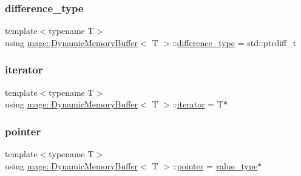 \subsubsection{\texorpdfstring{difference\+\_\+type}{difference\_type}}
{\footnotesize\ttfamily template$<$typename T$>$ \\
using \mbox{\hyperlink{classmage_1_1_dynamic_memory_buffer}{mage\+::\+Dynamic\+Memory\+Buffer}}$<$ T $>$\+::\mbox{\hyperlink{classmage_1_1_dynamic_memory_buffer_ae708f71fce978c1029c2228c249316a6}{difference\+\_\+type}} =  std\+::ptrdiff\+\_\+t}

\mbox{\label{classmage_1_1_dynamic_memory_buffer_aa5dca8e81d0c2a9e63d3a9bc61cce904}} 
\subsubsection{\texorpdfstring{iterator}{iterator}}
{\footnotesize\ttfamily template$<$typename T$>$ \\
using \mbox{\hyperlink{classmage_1_1_dynamic_memory_buffer}{mage\+::\+Dynamic\+Memory\+Buffer}}$<$ T $>$\+::\mbox{\hyperlink{classmage_1_1_dynamic_memory_buffer_aa5dca8e81d0c2a9e63d3a9bc61cce904}{iterator}} =  T$\ast$}

\mbox{\label{classmage_1_1_dynamic_memory_buffer_aa6880dd44d3de70601a158b693b98310}} 
\subsubsection{\texorpdfstring{pointer}{pointer}}
{\footnotesize\ttfamily template$<$typename T$>$ \\
using \mbox{\hyperlink{classmage_1_1_dynamic_memory_buffer}{mage\+::\+Dynamic\+Memory\+Buffer}}$<$ T $>$\+::\mbox{\hyperlink{classmage_1_1_dynamic_memory_buffer_aa6880dd44d3de70601a158b693b98310}{pointer}} =  \mbox{\hyperlink{classmage_1_1_dynamic_memory_buffer_a951f47f06268fe148ed617d17cad6150}{value\+\_\+type}}$\ast$}

\mbox{\label{classmage_1_1_dynamic_memory_buffer_a146681be5119c0329409436506334f05}} 
